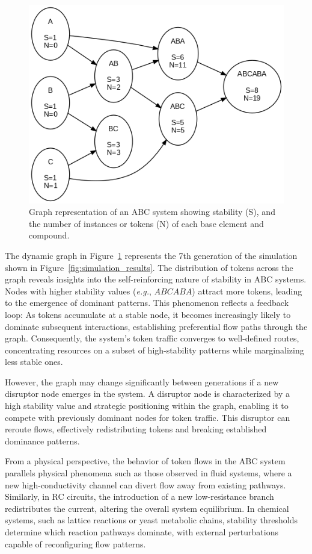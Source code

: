 \documentclass[entropy,article,submit,pdftex,oneauthor]{Definitions/mdpi}
\begin{document}
\begin{figure}[h]
    \centering
    \includegraphics[width=0.5\linewidth]{abc_graph.png}
    \caption{Graph representation of an ABC system showing stability (S), and the number of instances or tokens (N) of each base element and compound.}
    \label{fig:abc_sim}
\end{figure}

The dynamic graph in Figure~\ref{fig:abc_sim} represents the 7th generation of the simulation shown in Figure~\ref{fig:simulation_results}. The distribution of tokens across the graph reveals insights into the self-reinforcing nature of stability in ABC systems. Nodes with higher stability values (\textit{e.g.}, $ABCABA$) attract more tokens, leading to the emergence of dominant patterns. This phenomenon reflects a feedback loop: As tokens accumulate at a stable node, it becomes increasingly likely to dominate subsequent interactions, establishing preferential flow paths through the graph. Consequently, the system's token traffic converges to well-defined routes, concentrating resources on a subset of high-stability patterns while marginalizing less stable ones.

However, the graph may change significantly between generations if a new disruptor node emerges in the system. A disruptor node is characterized by a high stability value and strategic positioning within the graph, enabling it to compete with previously dominant nodes for token traffic. This disruptor can reroute flows, effectively redistributing tokens and breaking established dominance patterns. 

From a physical perspective, the behavior of token flows in the ABC system parallels physical phenomena such as those observed in fluid systems, where a new high-conductivity channel can divert flow away from existing pathways. Similarly, in RC circuits, the introduction of a new low-resistance branch redistributes the current, altering the overall system equilibrium. In chemical systems, such as lattice reactions or yeast metabolic chains, stability thresholds determine which reaction pathways dominate, with external perturbations capable of reconfiguring flow patterns.
\end{document}
